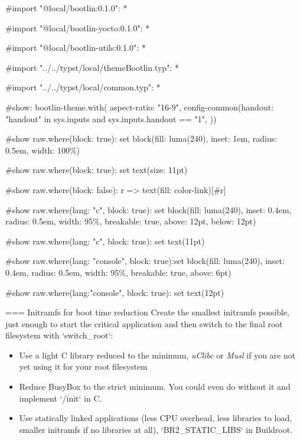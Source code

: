 #import "@local/bootlin:0.1.0": *

#import "@local/bootlin-yocto:0.1.0": *

#import "@local/bootlin-utils:0.1.0": *

#import "../../typst/local/themeBootlin.typ": *

#import "../../typst/local/common.typ": *

#show: bootlin-theme.with( aspect-ratio: "16-9", config-common(handout: "handout" in sys.inputs and sys.inputs.handout == "1", ))

#show raw.where(block: true): set block(fill: luma(240), inset: 1em, radius: 0.5em, width: 100\%)

#show raw.where(block: true): set text(size: 11pt)

#show raw.where(block: false): r => text(fill: color-link)[#r]

#show raw.where(lang: "c", block: true): set block(fill: luma(240), inset: 0.4em, radius: 0.5em, width: 95\%, breakable: true, above: 12pt, below: 12pt)

#show raw.where(lang: "c", block: true): set text(11pt)

#show raw.where(lang: "console", block: true):set block(fill: luma(240), inset: 0.4em, radius: 0.5em, width: 95\%, breakable: true, above: 6pt)

#show raw.where(lang:"console", block: true): set text(12pt)

=== Initramfs for boot time reduction Create the smallest initramfs possible, just enough to start the critical application and then switch to the final root filesystem with
`switch_root`:
\begin{itemize}
\item Use a light C library reduced to the minimum,
      {\em uClibc} or {\em Musl} if you are not yet using it for
      your root filesystem
\item Reduce BusyBox to the strict minimum.
      You could even do without it and implement `/init` in C.
\item Use statically linked applications (less CPU overhead, less
      libraries to load, smaller initramfs if no libraries at all),
      `BR2_STATIC_LIBS` in Buildroot.
\end{itemize}


